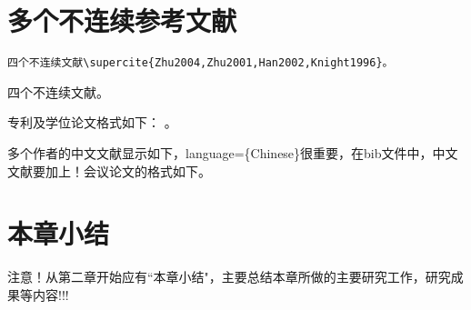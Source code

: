 \section{多个不连续参考文献}\label{section5-3}
 \begin{verbatim}
四个不连续文献\supercite{Zhu2004,Zhu2001,Han2002,Knight1996}。
\end{verbatim}
四个不连续文献\supercite{desouzaComparisonExperimentalPID2016,hejunhuZiPingHengCheKongZhiFangFaYanJiuJiFangZhenFenXi2019,huangqiangShuangBiHuanPIDKongZhiDeLiangLunPingHengXiaoCheSheJiYuShiXian2020,lishuainanJiYuSTM32KongZhiDeShuangLunZiPingHengXiaoCheDeSheJi2018}。

专利及学位论文格式如下：
\cite{caichangtaoLiangLunXiaoCheZiPingHengKongZhiXiTongDeYanJiuYuSheJi2018}。

多个作者的中文文献显示如下\cite{hewentaoSTM32KongZhiQiDeZiTaiJieSuanHuBuLuBoQiSheJi2020}，language=\{Chinese\}很重要，在bib文件中，中文文献要加上！会议论文的格式如下\cite{duliminJiYuDanPianJiDeLiangLunZiDongPingHengXiaoCheXiTongDeSheJi2020}。


\section{本章小结}\label{section5-4}
注意！从第二章开始应有``本章小结"，主要总结本章所做的主要研究工作，研究成果等内容!!!
